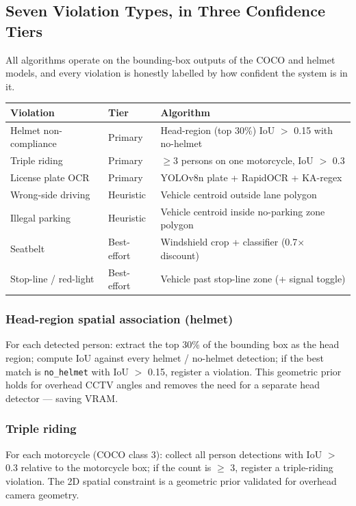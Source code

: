 \documentclass[11pt,a4paper]{article}
\begin{document}
\subsection{Seven Violation Types, in Three Confidence Tiers}

All algorithms operate on the bounding-box outputs of the COCO and helmet models, and every violation is honestly labelled by how confident the system is in it.

\begin{longtable}{@{}>{\raggedright\arraybackslash}p{3.2cm}>{\raggedright\arraybackslash}p{2.0cm}p{5.9cm}@{}}
\hline
\textbf{Violation} & \textbf{Tier} & \textbf{Algorithm} \\
\hline
Helmet non-compliance & Primary & Head-region (top 30\%) IoU $>$ 0.15 with no-helmet \\
Triple riding & Primary & $\ge$3 persons on one motorcycle, IoU $>$ 0.3 \\
License plate OCR & Primary & YOLOv8n plate + RapidOCR + KA-regex \\
Wrong-side driving & Heuristic & Vehicle centroid outside lane polygon \\
Illegal parking & Heuristic & Vehicle centroid inside no-parking zone polygon \\
Seatbelt & Best-effort & Windshield crop + classifier (0.7$\times$ discount) \\
Stop-line / red-light & Best-effort & Vehicle past stop-line zone (+ signal toggle) \\
\hline
\end{longtable}

\subsubsection{Head-region spatial association (helmet)}
For each detected person: extract the top 30\% of the bounding box as the head region; compute IoU against every helmet / no-helmet detection; if the best match is \texttt{no\_helmet} with IoU $>$ 0.15, register a violation. This geometric prior holds for overhead CCTV angles and removes the need for a separate head detector — saving VRAM.

\subsubsection{Triple riding}
For each motorcycle (COCO class 3): collect all person detections with IoU $>$ 0.3 relative to the motorcycle box; if the count is $\ge$ 3, register a triple-riding violation. The 2D spatial constraint is a geometric prior validated for overhead camera geometry.
\end{document}
